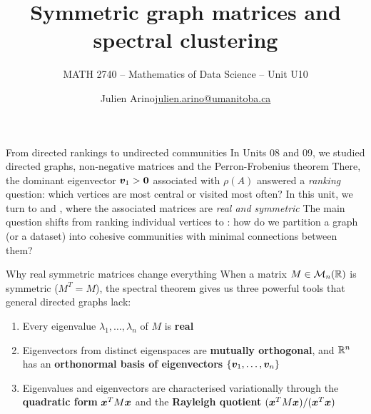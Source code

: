 \documentclass[aspectratio=169]{beamer}\usepackage[]{graphicx}\usepackage[]{xcolor}
\subtitle{MATH 2740 -- Mathematics of Data Science -- Unit U10}
\author{\texorpdfstring{Julien Arino\newline\url{julien.arino@umanitoba.ca}}{Julien Arino}}
\institute{Department of Mathematics @ University of Manitoba}
\title{Symmetric graph matrices and spectral clustering}
\begin{document}
\setcounter{theorem}{156}

\SStitlepage
\SSoutlinepage


\begin{frame}{From directed rankings to undirected communities}
In Units 08 and 09, we studied directed graphs, non-negative matrices and the Perron-Frobenius theorem
\vfill
There, the dominant eigenvector $\bv_1 > \b0$ associated with $\rho(A)$ answered a \emph{ranking} question: which vertices are most central or visited most often?
\vfill
In this unit, we turn to  and , where the associated matrices are \emph{real and symmetric}
\vfill
The main question shifts from ranking individual vertices to : how do we partition a graph (or a dataset) into cohesive communities with minimal connections between them?
\end{frame}


\begin{frame}{Why real symmetric matrices change everything}
When a matrix $M \in \mathcal{M}_n(\mathbb{R})$ is symmetric ($M^T = M$), the spectral theorem gives us three powerful tools that general directed graphs lack:
\vfill
\begin{enumerate}
\item Every eigenvalue $\lambda_1, \ldots, \lambda_n$ of $M$ is \textbf{real}
\vfill
\item Eigenvectors from distinct eigenspaces are \textbf{mutually orthogonal}, and $\mathbb{R}^n$ has an \textbf{orthonormal basis of eigenvectors} $\{\bm{v}_1, \ldots, \bm{v}_n\}$
\vfill
\item Eigenvalues and eigenvectors are characterised variationally through the \textbf{quadratic form} $\bm{x}^T M \bm{x}$ and the \textbf{Rayleigh quotient} $(\bm{x}^T M \bm{x})/(\bm{x}^T \bm{x})$
\end{enumerate}
\end{frame}
\end{document}
